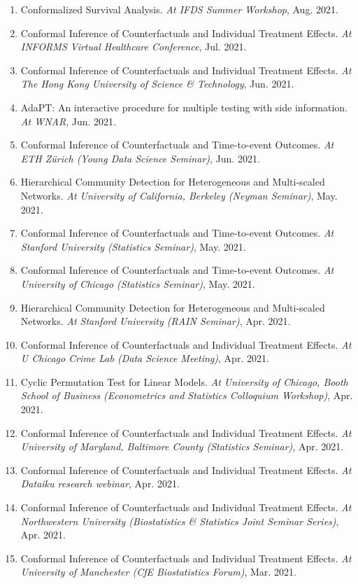 \documentclass{article}
\begin{document}
\begin{enumerate}
\item Conformalized Survival Analysis. \emph{At IFDS Summer Workshop}, Aug. 2021.
\item Conformal Inference of Counterfactuals and Individual Treatment Effects. \emph{At INFORMS Virtual Healthcare Conference}, Jul. 2021.
\item Conformal Inference of Counterfactuals and Individual Treatment Effects. \emph{At The Hong Kong University of Science \& Technology}, Jun. 2021.
\item AdaPT: An interactive procedure for multiple testing with side information. \emph{At WNAR}, Jun. 2021.
\item Conformal Inference of Counterfactuals and Time-to-event Outcomes. \emph{At ETH Z\"{u}rich (Young Data Science Seminar)}, Jun. 2021.
\item Hierarchical Community Detection for Heterogeneous and Multi-scaled Networks. \emph{At University of California, Berkeley (Neyman Seminar)}, May. 2021.
\item Conformal Inference of Counterfactuals and Time-to-event Outcomes. \emph{At Stanford University (Statistics Seminar)}, May. 2021.
\item Conformal Inference of Counterfactuals and Time-to-event Outcomes. \emph{At University of Chicago (Statistics Seminar)}, May. 2021.
\item Hierarchical Community Detection for Heterogeneous and Multi-scaled Networks. \emph{At Stanford University (RAIN Seminar)}, Apr. 2021.
\item Conformal Inference of Counterfactuals and Individual Treatment Effects. \emph{At U Chicago Crime Lab (Data Science Meeting)}, Apr. 2021.
\item Cyclic Permutation Test for Linear Models. \emph{At University of Chicago, Booth School of Business (Econometrics and Statistics Colloquium Workshop)}, Apr. 2021.
\item Conformal Inference of Counterfactuals and Individual Treatment Effects. \emph{At University of Maryland, Baltimore County (Statistics Seminar)}, Apr. 2021.
\item Conformal Inference of Counterfactuals and Individual Treatment Effects. \emph{At Dataiku research webinar}, Apr. 2021.
\item Conformal Inference of Counterfactuals and Individual Treatment Effects. \emph{At Northwestern University (Biostatistics \& Statistics Joint Seminar Series)}, Apr. 2021.
\item Conformal Inference of Counterfactuals and Individual Treatment Effects. \emph{At University of Manchester (CfE Biostatistics Forum)}, Mar. 2021.

\end{enumerate}
\end{document}
